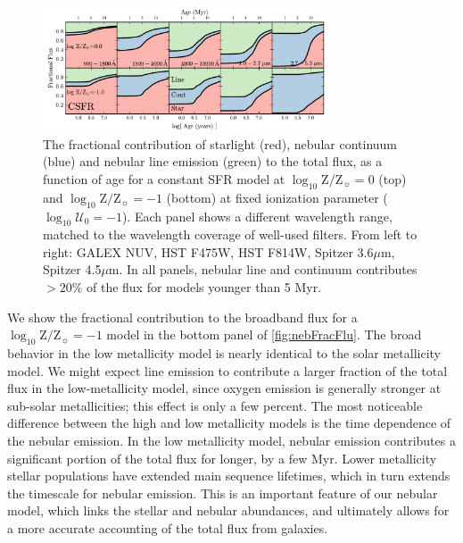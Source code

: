 \documentclass[linenumbers, trackchanges, tighten]{aastex61}%
\newcommand{\Fig}[1]{\autoref{fig:#1}}
\newcommand{\logten}{\ensuremath{\log_{10}}}
\newcommand{\logZeq}[1]{\ensuremath{\logten \mathrm{Z}/\mathrm{Z}_{\sun} = #1}}
\newcommand{\logU}{\ensuremath{\logten \mathcal{U}_0}}
\begin{document}
\begin{figure}[!htbp]
  \begin{centering}
    \includegraphics[width=0.75\textwidth]{f13.pdf}
    \caption{The fractional contribution of starlight (red), nebular continuum (blue) and nebular line emission (green) to the total flux, as a function of age for a constant SFR model at \logZeq{0} (top) and \logZeq{-1} (bottom) at fixed ionization parameter ($\logU=-1$). Each panel shows a different wavelength range, matched to the wavelength coverage of well-used filters. From left to right: GALEX NUV, HST F475W, HST F814W, Spitzer 3.6$\mu$m, Spitzer 4.5$\mu$m. In all panels, nebular line and continuum contributes $>20\%$ of the flux for models younger than 5 Myr.}
    \label{fig:nebFracFlu2}
  \end{centering}
\end{figure}
We show the fractional contribution to the broadband flux for a \logZeq{-1} model in the bottom panel of \Fig{nebFracFlu}. The broad behavior in the low metallicity model is nearly identical to the solar metallicity model. We might expect line emission to contribute a larger fraction of the total flux in the low-metallicity model, since oxygen emission is generally stronger at sub-solar metallicities; this effect is only a few percent. The most noticeable difference between the high and low metallicity models is the time dependence of the nebular emission. In the low metallicity model, nebular emission contributes a significant portion of the total flux for longer, by a few Myr. Lower metallicity stellar populations have extended main sequence lifetimes, which in turn extends the timescale for nebular emission. This is an important feature of our nebular model, which links the stellar and nebular abundances, and ultimately allows for a more accurate accounting of the total flux from galaxies.
\end{document}
